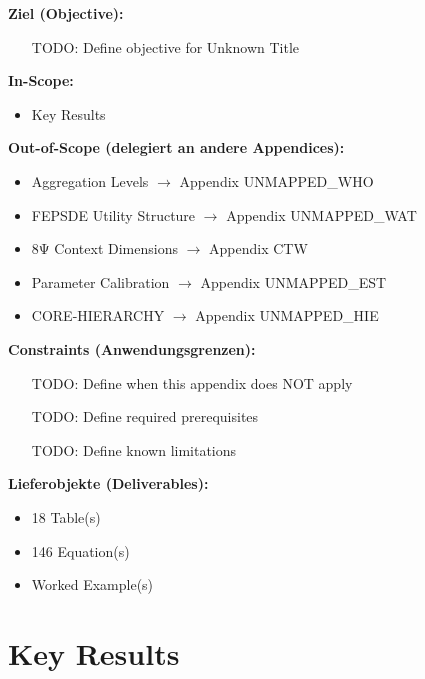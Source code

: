 \begin{tcolorbox}[
    colback=orange!5!white,
    colframe=orange!75!black,
    title={\textbf{Appendix Scope: Ziel / In-Scope / Out-of-Scope / Constraints}},
    fonttitle=\bfseries
]

\textbf{Ziel (Objective):}
\begin{itemize}[nosep]
    \item [TODO: Define objective for Unknown Title]
\end{itemize}

\textbf{In-Scope:}
\begin{itemize}[nosep]
    \item Key Results
\end{itemize}

\textbf{Out-of-Scope (delegiert an andere Appendices):}
\begin{itemize}[nosep]
    \item Aggregation Levels $\rightarrow$ Appendix UNMAPPED_WHO
    \item FEPSDE Utility Structure $\rightarrow$ Appendix UNMAPPED_WAT
    \item 8Ψ Context Dimensions $\rightarrow$ Appendix CTW
    \item Parameter Calibration $\rightarrow$ Appendix UNMAPPED_EST
    \item CORE-HIERARCHY $\rightarrow$ Appendix UNMAPPED_HIE
\end{itemize}

\textbf{Constraints (Anwendungsgrenzen):}
\begin{itemize}[nosep]
    \item [TODO: Define when this appendix does NOT apply]
    \item [TODO: Define required prerequisites]
    \item [TODO: Define known limitations]
\end{itemize}

\textbf{Lieferobjekte (Deliverables):}
\begin{itemize}[nosep]
    \item 18 Table(s)
    \item 146 Equation(s)
    \item Worked Example(s)
\end{itemize}

\end{tcolorbox}


\section{Key Results}
\label{sec:B-key-results}

